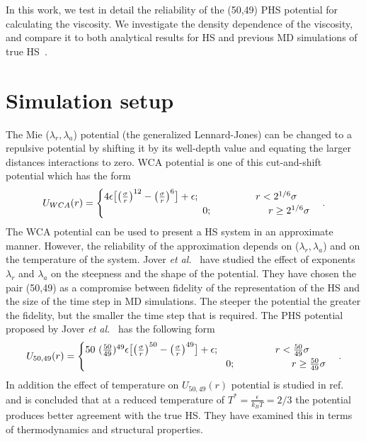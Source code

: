 \documentclass[preprint,pre,aps,superscriptaddress,a4paper]{revtex4}
\begin{document}
In this work, we test in detail the reliability of the (50,49) PHS potential for calculating the viscosity.
{ We investigate the density dependence of the viscosity, and compare it to both analytical results for HS and previous MD simulations of true HS~\cite{heyes:09:0}.  }
\section{Simulation setup}
{ The Mie ($\lambda_r, \lambda_a$) potential (the generalized Lennard-Jones) can be changed to a repulsive potential by shifting it by its well-depth value and equating the larger distances interactions to zero. WCA potential is one of this cut-and-shift potential which has the  form 
\[ U_{WCA}(r)=
  \begin{cases} 
   4 \epsilon \big[ \big(\frac{\sigma}{r}\big)^{12}-\big(\frac{\sigma}{r}\big)^{6 }  \big]+\epsilon; \hspace{2cm}  r<   2^{1/6} \sigma \\
   \hspace{3.5cm}  0  ; \hspace{2cm}     r \geq   2^{1/6}\sigma
   \label{eqWCA}
  \end{cases}.
\]
\vspace{-1cm}
\begin{equation}
\end{equation}
The WCA potential can be used to present a HS system in an approximate manner. However, the reliability of the approximation depends on  ($\lambda_r, \lambda_a$) and on the temperature of the system.  Jover {\it {et al.}}~\cite{jover:12:0} have  studied the effect of  exponents  $\lambda_r$ and $\lambda_a$ on the steepness and the shape of the potential. They have chosen the pair (50,49) as a compromise between fidelity of the representation of the HS and the size of the time step in MD simulations.  The steeper the potential the greater the fidelity, but the smaller the time step that is required. 
The PHS potential  proposed by  Jover {\it {et al.}}~\cite{jover:12:0}  has the following form
\[U_{50,49}(r)=
  \begin{cases} 
   50 ~ (\frac{50}{49})^{49} \epsilon \big[ \big(\frac{\sigma}{r}\big)^{50 }-\big(\frac{\sigma}{r}\big)^{49 }  \big]+\epsilon; \hspace{2cm}  r<   \frac{50}{49} \sigma \\
   \hspace{5.cm}  0  ; \hspace{2cm}     r \geq   \frac{50}{49} \sigma
   \label{eqPHS}
  \end{cases}.
\]
\vspace{-1cm}
\begin{equation}
\end{equation}
In addition the effect of  temperature on $U_{50,49}(r)$ potential is studied in ref.~\cite{jover:12:0} and is  concluded that at  a reduced temperature of $ T^*=\frac{\epsilon}{k_B T}=2/3$ the potential  produces better agreement with  the true HS.   They have  examined  this  in terms of thermodynamics and structural properties.}
\end{document}
